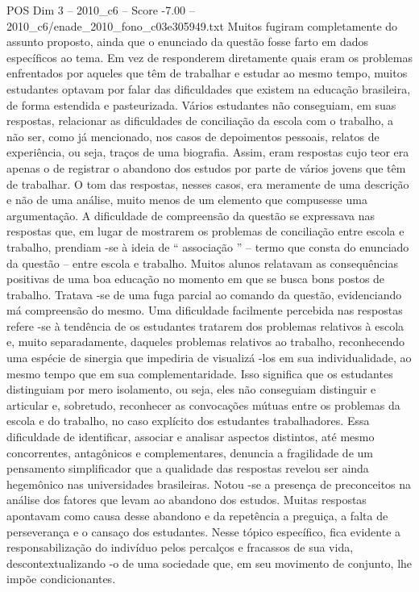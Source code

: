 \begin{textsample}{POS Dim 3 – 2010\_c6 – Score -7.00 – 2010\_c6/enade\_2010\_fono\_c03e305949.txt}
Muitos fugiram completamente do assunto proposto, ainda que o enunciado da questão fosse farto em dados específicos ao tema.
Em vez de responderem diretamente quais eram os problemas enfrentados por aqueles que têm de trabalhar e estudar ao mesmo tempo, muitos estudantes optavam por falar das dificuldades que existem na educação brasileira, de forma estendida e pasteurizada.
Vários estudantes não conseguiam, em suas respostas, relacionar as dificuldades de conciliação da escola com o trabalho, a não ser, como já mencionado, nos casos de depoimentos pessoais, relatos de experiência, ou seja, traços de uma biografia.
Assim, eram respostas cujo teor era apenas o de registrar o abandono dos estudos por parte de vários jovens que têm de trabalhar.
O tom das respostas, nesses casos, era meramente de uma descrição e não de uma análise, muito menos de um elemento que compusesse uma argumentação.
A dificuldade de compreensão da questão se expressava nas respostas que, em lugar de mostrarem os problemas de conciliação entre escola e trabalho, prendiam -se à ideia de “ associação ” – termo que consta do enunciado da questão – entre escola e trabalho.
Muitos alunos relatavam as consequências positivas de uma boa educação no momento em que se busca bons postos de trabalho.
Tratava -se de uma fuga parcial ao comando da questão, evidenciando má compreensão do mesmo.
Uma dificuldade facilmente percebida nas respostas refere -se à tendência de os estudantes tratarem dos problemas relativos à escola e, muito separadamente, daqueles problemas relativos ao trabalho, reconhecendo uma espécie de sinergia que impediria de visualizá -los em sua individualidade, ao mesmo tempo que em sua complementaridade.
Isso significa que os estudantes distinguiam por mero isolamento, ou seja, eles não conseguiam distinguir e articular e, sobretudo, reconhecer as convocações mútuas entre os problemas da escola e do trabalho, no caso explícito dos estudantes trabalhadores.
Essa dificuldade de identificar, associar e analisar aspectos distintos, até mesmo concorrentes, antagônicos e complementares, denuncia a fragilidade de um pensamento simplificador que a qualidade das respostas revelou ser ainda hegemônico nas universidades brasileiras.
Notou -se a presença de preconceitos na análise dos fatores que levam ao abandono dos estudos.
Muitas respostas apontavam como causa desse abandono e da repetência a preguiça, a falta de perseverança e o cansaço dos estudantes.
Nesse tópico específico, fica evidente a responsabilização do indivíduo pelos percalços e fracassos de sua vida, descontextualizando -o de uma sociedade que, em seu movimento de conjunto, lhe impõe condicionantes.

\end{textsample}
